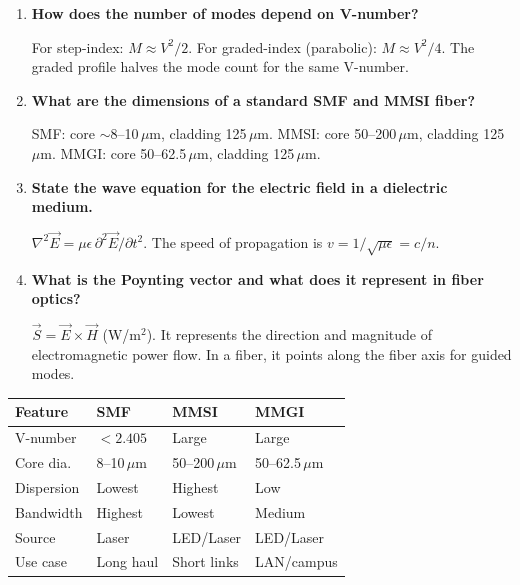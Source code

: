 \documentclass[12pt,a4paper]{article}
\newcommand{\Q}[1]{\textbf{#1}\par\noindent\ignorespaces}
\renewcommand{\arraystretch}{1.45}
\begin{document}
\begin{tcolorbox}[exambox, title={\textbf{Frequently Asked / Viva Questions}}]
\begin{enumerate}[topsep=0pt, label=\textbf{Q\arabic*.}, itemsep=5pt]
  \item \Q{How does the number of modes depend on V-number?}
    For step-index: $M \approx V^2/2$. For graded-index (parabolic): $M \approx V^2/4$. The graded profile halves the mode count for the same V-number.
  \item \Q{What are the dimensions of a standard SMF and MMSI fiber?}
    SMF: core $\sim$8--10\,$\mu$m, cladding 125\,$\mu$m. MMSI: core 50--200\,$\mu$m, cladding 125\,$\mu$m. MMGI: core 50--62.5\,$\mu$m, cladding 125\,$\mu$m.
  \item \Q{State the wave equation for the electric field in a dielectric medium.}
    $\nabla^2 \vec{E} = \mu\epsilon\, \partial^2\vec{E}/\partial t^2$. The speed of propagation is $v = 1/\sqrt{\mu\epsilon} = c/n$.
  \item \Q{What is the Poynting vector and what does it represent in fiber optics?}
    $\vec{S} = \vec{E} \times \vec{H}$ (W/m$^2$). It represents the direction and magnitude of electromagnetic power flow. In a fiber, it points along the fiber axis for guided modes.
\end{enumerate}
\end{tcolorbox}

\begin{tcolorbox}[tikzbox, title={Summary: Fiber Type Comparison at a Glance}]
\centering
{\renewcommand{\arraystretch}{1.45}
\begin{tabularx}{\linewidth}{|B{3.0cm}|Y|Y|Y|}
\hline
\textbf{Feature} & \textbf{SMF} & \textbf{MMSI} & \textbf{MMGI} \\
\hline
V-number & $< 2.405$ & Large & Large \\
\hline
Core dia.\ & 8--10\,$\mu$m & 50--200\,$\mu$m & 50--62.5\,$\mu$m \\
\hline
Dispersion & Lowest & Highest & Low \\
\hline
Bandwidth & Highest & Lowest & Medium \\
\hline
Source & Laser & LED/Laser & LED/Laser \\
\hline
Use case & Long haul & Short links & LAN/campus \\
\hline
\end{tabularx}}
\end{tcolorbox}
\end{document}
